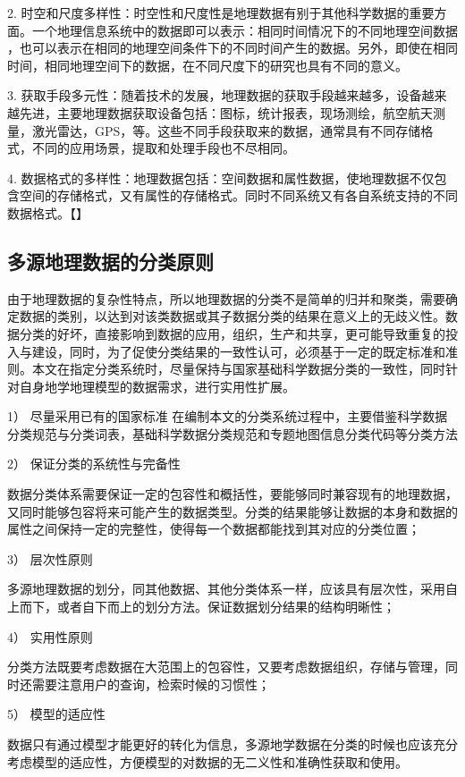 \documentclass[master]{njnuthesis}
\begin{document}
2. 时空和尺度多样性：时空性和尺度性是地理数据有别于其他科学数据的重要方面。一个地理信息系统中的数据即可以表示：相同时间情况下的不同地理空间数据 ，也可以表示在相同的地理空间条件下的不同时间产生的数据。另外，即使在相同时间，相同地理空间下的数据，在不同尺度下的研究也具有不同的意义。

3. 获取手段多元性：随着技术的发展，地理数据的获取手段越来越多，设备越来越先进，主要地理数据获取设备包括：图标，统计报表，现场测绘，航空航天测量，激光雷达，GPS，等。这些不同手段获取来的数据，通常具有不同存储格式，不同的应用场景，提取和处理手段也不尽相同。

4. 数据格式的多样性：地理数据包括：空间数据和属性数据，使地理数据不仅包含空间的存储格式，又有属性的存储格式。同时不同系统又有各自系统支持的不同数据格式。【】

\subsection{多源地理数据的分类原则}
由于地理数据的复杂性特点，所以地理数据的分类不是简单的归并和聚类，需要确定数据的类别，以达到对该类数据或其子数据分类的结果在意义上的无歧义性。数据分类的好坏，直接影响到数据的应用，组织，生产和共享，更可能导致重复的投入与建设，同时，为了促使分类结果的一致性认可，必须基于一定的既定标准和准则。本文在指定分类系统时，尽量保持与国家基础科学数据分类的一致性，同时针对自身地学地理模型的数据需求，进行实用性扩展。

1）	尽量采用已有的国家标准
在编制本文的分类系统过程中，主要借鉴科学数据分类规范与分类词表，基础科学数据分类规范和专题地图信息分类代码等分类方法

2）	保证分类的系统性与完备性

数据分类体系需要保证一定的包容性和概括性，要能够同时兼容现有的地理数据，又同时能够包容将来可能产生的数据类型。分类的结果能够让数据的本身和数据的属性之间保持一定的完整性，使得每一个数据都能找到其对应的分类位置；

3）	层次性原则

多源地理数据的划分，同其他数据、其他分类体系一样，应该具有层次性，采用自上而下，或者自下而上的划分方法。保证数据划分结果的结构明晰性；

4）	实用性原则

分类方法既要考虑数据在大范围上的包容性，又要考虑数据组织，存储与管理，同时还需要注意用户的查询，检索时候的习惯性；

5）	模型的适应性

数据只有通过模型才能更好的转化为信息，多源地学数据在分类的时候也应该充分考虑模型的适应性，方便模型的对数据的无二义性和准确性获取和使用。
\end{document}
